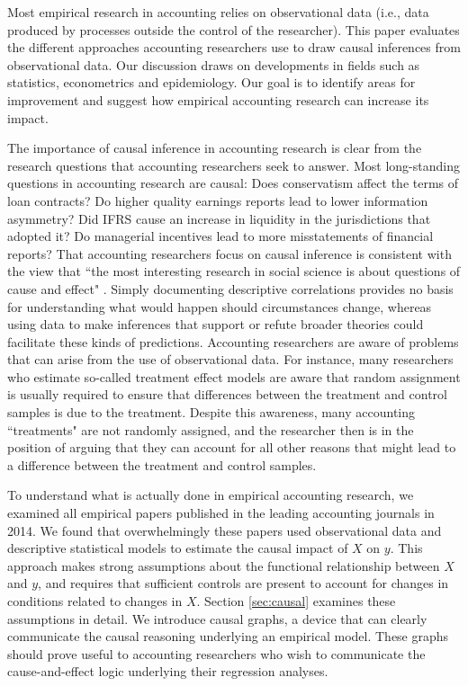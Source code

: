 \documentclass[11pt,reqno,titlepage]{amsart}
\begin{document}
\begin{doublespace} 
Most empirical research in accounting relies on observational data (i.e., data produced by processes outside the control of the researcher).
This paper evaluates the different approaches accounting researchers use to draw causal inferences from observational data. 
Our discussion draws on developments in 
fields such as statistics, econometrics and epidemiology. Our goal is to identify areas for improvement and suggest how empirical accounting research can increase its impact.

The importance of causal inference in accounting research is clear from the research questions that accounting researchers seek to answer. 
Most long-standing questions in accounting research are causal: 
Does conservatism affect the terms of loan contracts?
Do higher quality earnings reports lead to lower information asymmetry? 
Did IFRS cause an increase in liquidity in the jurisdictions that adopted it?
Do managerial incentives lead to more misstatements of financial reports?
That accounting researchers focus on causal inference is consistent with the view that ``the most interesting research in social science is about questions of cause and effect" \cite[p. 3]{Angrist:2008vk}.
Simply documenting descriptive correlations provides no basis for understanding what would happen should circumstances change, 
whereas using data to make inferences that support or refute broader theories could facilitate these kinds of predictions.
Accounting researchers are aware of problems that can arise from the use of observational data.
For instance, many researchers who estimate so-called treatment effect models are aware that random assignment is usually required to ensure that differences between the treatment and control samples is due to the treatment. 
Despite this awareness, many accounting ``treatments" are not randomly assigned, and the researcher then is in the position of arguing that they can account for all other reasons that might lead to a difference between the treatment and control samples.

To understand what is actually done in empirical accounting research, we examined all empirical papers published in the leading accounting journals in 2014. 
We found that overwhelmingly these papers used observational data and descriptive statistical models to estimate the causal impact of $X$ on $y$. 
This approach makes strong assumptions about the functional relationship between $X$ and $y$, and requires that sufficient controls are present to account for changes in conditions related to changes in $X$.
Section \ref{sec:causal} examines these assumptions in detail.
We introduce causal graphs, a device that can clearly communicate the causal reasoning underlying an empirical model.
These graphs should prove useful to accounting researchers who wish to communicate the cause-and-effect logic underlying their regression analyses.



\end{doublespace}
\end{document}

